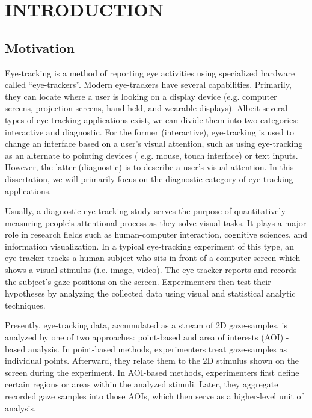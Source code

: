 \chapter{INTRODUCTION}
\label{chap:Intro}

\section{Motivation}
\label{sec:Motivation}
Eye-tracking is a method of reporting eye activities using specialized hardware called ``eye-trackers''. Modern eye-trackers have several capabilities. Primarily, they can locate where a user is looking on a display device (e.g. computer screens, projection screens, hand-held, and wearable displays). Albeit several types of eye-tracking applications exist, we can divide them into two categories: interactive and diagnostic. For the former (interactive), eye-tracking is used to change an interface based on a user's visual attention, such as using eye-tracking as an alternate to pointing devices ( e.g. mouse, touch interface) or text inputs. However, the latter  (diagnostic) is to describe a user's visual attention. In this dissertation, we will primarily focus on the diagnostic category of eye-tracking applications. 

Usually, a diagnostic eye-tracking study serves the purpose of quantitatively measuring people's attentional process as they solve visual tasks. It plays a major role in research fields such as human-computer interaction, cognitive sciences, and information visualization. In a typical eye-tracking experiment of this type, an eye-tracker tracks a human subject who sits in front of a computer screen which shows a visual stimulus (i.e. image, video). The eye-tracker reports and records the subject's gaze-positions on the screen. Experimenters then test their hypotheses by analyzing the collected data using visual and statistical analytic techniques. 

Presently, eye-tracking data, accumulated as a stream of 2D gaze-samples, is analyzed by one of two approaches: point-based and area of interests (AOI) -based analysis. In point-based methods, experimenters treat gaze-samples as individual points. Afterward, they relate them to the 2D stimulus shown on the screen during the experiment. In AOI-based methods, experimenters first define certain regions or areas within the analyzed stimuli. Later, they aggregate recorded gaze samples into those AOIs, which then serve as a higher-level unit of analysis.


